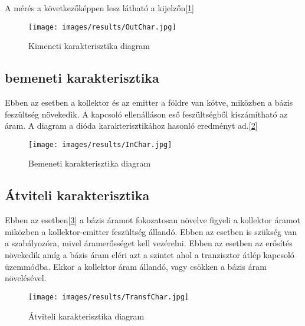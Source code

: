 A mérés a következőképpen lesz látható a kijelzőn[\ref{fig:OutChar}] 

\begin{figure}[H]
    \centering
    \texttt{[image: images/results/OutChar.jpg]}
    \caption{Kimeneti karakterisztika diagram}
    \label{fig:OutChar}
\end{figure}

\subsection{bemeneti karakterisztika}

Ebben az esetben a kollektor és az emitter a földre van kötve,
miközben a bázis feszültség növekedik. A kapcsoló ellenálláson eső feszültségből
kiszámítható az áram. A diagram a dióda karakterisztikához hasonló eredményt
ad.[\ref{fig:InChar}] 

\begin{figure}[H]
    \centering
    \texttt{[image: images/results/InChar.jpg]}
    \caption{Bemeneti karakterisztika diagram}
    \label{fig:InChar}
\end{figure}

\subsection{Átviteli karakterisztika}

Ebben az esetben[\ref{fig:transfChar}]  a bázis áramot fokozatosan növelve figyeli a kollektor
áramot miközben a kollektor-emitter feszültség állandó.
Ebben az esetben is szükség van a szabályozóra, mivel áramerősséget kell
vezérelni. Ebben az esetben az erősítés növekedik amíg a bázis
áram eléri azt a szintet ahol a tranzisztor átlép kapcsoló
üzemmódba. Ekkor a kollektor áram állandó, vagy csökken a bázis áram
növelésével.

\begin{figure}[H]
    \centering
    \texttt{[image: images/results/TransfChar.jpg]}
    \caption{Átviteli karakterisztika diagram}
    \label{fig:transfChar}
\end{figure}
